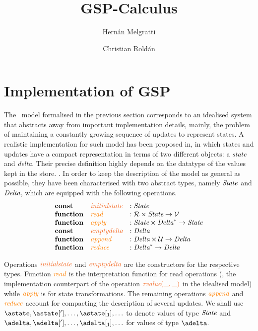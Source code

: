 \documentclass[envcountsect,runningheads,orivec]{llncs}
\title{GSP-Calculus}
\author{Hern\'an Melgratti\inst{1,2} \and Christian Rold\'an\inst{1} 
        }
\institute{
  Departamento de Computaci\'on, FCEyN, Universidad de Buenos Aires.
\\
\and CONICET.}
\begin{document}
\maketitle

\begin{abstract}
\end{abstract}




\section{Implementation of GSP}

The \tgspcalculus\ model formalised in the previous section corresponds to an idealised system that
abstracts away from important implementation details, mainly, the  problem of maintaining a constantly growing 
sequence of updates to represent states.  A realistic implementation for such model has been 
proposed in\henote{~\cite{}}, in which states and updates have a compact representation in 
terms of two different objects: a {\em state} and {\em delta}. Their precise definition highly depends
on the datatype of the values kept in the store. . 
In order to keep the description of the model as general as possible, they have been
characterised  with 
two abstract types, namely $\textit{State}$ and $\textit{Delta}$, which are equipped with the following  operations.
\[
\begin{array}{lll}
	\textbf{const} & \initialstate & : \statetype \\
	\textbf{function} & \ireadname & : \partialfunction{\readtype \times \statetype}{\valuetype} \\
	\textbf{function} & \iapplyname & : \partialfunction{\statetype \times \deltatype^*}{\statetype} \\
	\textbf{const} & \emptydelta & : \deltatype \\
	\textbf{function} & \iappendname & : \partialfunction{\deltatype \times \updatetype}{\deltatype} \\
	\textbf{function} & \ireducename & : \partialfunction{\deltatype^*}{\deltatype} \\
\end{array}
\] 

Operations $\initialstate$ and $\emptydelta$ are the constructors for the respective types. Function $\textcolor{orange}{\textit{read}}$ is the 
interpretation function for read operations (\ie, the implementation counterpart of the operation $\rvalue{\_}{\_}$  in the 
idealised model) while $\textcolor{orange}{\textit{apply}}$ is for state transformations. The remaining operations $\textcolor{orange}{\textit{append}}$ and
$\textcolor{orange}{\textit{reduce}}$ account for compacting the description of several updates. 
%
We shall use  $\astate,\astate['],\ldots, \astate[{_1}],\ldots$ to denote values of  type $\textit{State}$ and 
$\adelta,\adelta['],\ldots, \adelta[{_1}],\ldots$ for values of type $\pushbuffertype$.
\end{document}
